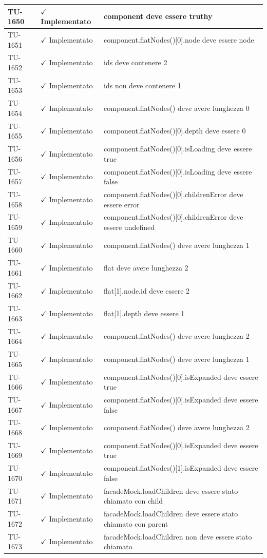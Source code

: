 ﻿\documentclass[a4paper,12pt]{article}
\newcommand{\ok}{\textcolor{green!60!black}{$\checkmark$ Implementato}}
\begin{document}
\begin{longtable}{|p{2cm}|p{3.5cm}|p{9.5cm}|}
\hline
TU-1650 & \ok & component deve essere truthy \\
\hline
TU-1651 & \ok & component.flatNodes()[0].node deve essere node \\
\hline
TU-1652 & \ok & ids deve contenere 2 \\
\hline
TU-1653 & \ok & ids non deve contenere 1 \\
\hline
TU-1654 & \ok & component.flatNodes() deve avere lunghezza 0 \\
\hline
TU-1655 & \ok & component.flatNodes()[0].depth deve essere 0 \\
\hline
TU-1656 & \ok & component.flatNodes()[0].isLoading deve essere true \\
\hline
TU-1657 & \ok & component.flatNodes()[0].isLoading deve essere false \\
\hline
TU-1658 & \ok & component.flatNodes()[0].childrenError deve essere error \\
\hline
TU-1659 & \ok & component.flatNodes()[0].childrenError deve essere undefined \\
\hline
TU-1660 & \ok & component.flatNodes() deve avere lunghezza 1 \\
\hline
TU-1661 & \ok & flat deve avere lunghezza 2 \\
\hline
TU-1662 & \ok & flat[1].node.id deve essere 2 \\
\hline
TU-1663 & \ok & flat[1].depth deve essere 1 \\
\hline
TU-1664 & \ok & component.flatNodes() deve avere lunghezza 2 \\
\hline
TU-1665 & \ok & component.flatNodes() deve avere lunghezza 1 \\
\hline
TU-1666 & \ok & component.flatNodes()[0].isExpanded deve essere true \\
\hline
TU-1667 & \ok & component.flatNodes()[0].isExpanded deve essere false \\
\hline
TU-1668 & \ok & component.flatNodes() deve avere lunghezza 2 \\
\hline
TU-1669 & \ok & component.flatNodes()[0].isExpanded deve essere true \\
\hline
TU-1670 & \ok & component.flatNodes()[1].isExpanded deve essere false \\
\hline
TU-1671 & \ok & facadeMock.loadChildren deve essere stato chiamato con child \\
\hline
TU-1672 & \ok & facadeMock.loadChildren deve essere stato chiamato con parent \\
\hline
TU-1673 & \ok & facadeMock.loadChildren non deve essere stato chiamato \\

\end{longtable}
\end{document}
